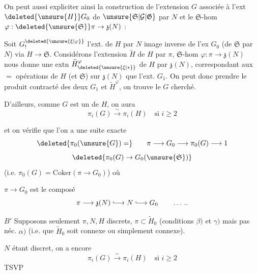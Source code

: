 On peut aussi expliciter ainsi la construction de l'extension \(G\)  associée à l'ext \(\deleted{\unsure{H}}G_0\) de \(\unsure{\mathfrak{S}|\mathcal{G}|\mathfrak{G}}\) par \(N\) et le \(\mathfrak{S}\)-hom \(\varphi:\deleted{\unsure{\mathfrak{S}}}\pi\to\mathfrak{z}(N)\) :

Soit \(G_{!}^{\deleted{\unsure{\xi|\varphi}}}\) l'ext. de \(H\) par \(N\) image inverse de l'ex \(G_0\) (de \(\mathfrak{S}\) par \(N\)) via \(H\to\mathfrak{S}\). Considérons l'extension \(\widetilde H\) de \(H\) par \(\pi\),  \(\mathfrak{S}\)-hom \(\varphi:\pi\to\mathfrak{z}(N)\) nous donne une extn  \(\widetilde H^{\varphi}_{\deleted{\unsure{\xi|\ast}}}\) de \(H\) par \(\mathfrak{z}(N)\), correspondant aux \(=\) opérations de \(H\) (et \(\mathfrak{S}\)) sur \(\mathfrak{z}(N)\) que l'ext. \(G_1\). On peut donc prendre le produit contracté des deux  \(G_1\) et \(\widetilde H^\varphi\), on trouve le \(G\) cherché.

D'ailleurs,  comme \(G\) est un  de \(H\), on aura
\[
 \pi_i(G)\xrightarrow{\sim}\pi_i(H)\quad\text{si }i\geq2
\]

et on vérifie que l'on a une suite exacte
\[
 \deleted{\pi_0(\unsure{G})=}\qquad
 \pi\longrightarrow G_0\longrightarrow\pi_0(G)\longrightarrow1
\]
\[
 \deleted{\pi_0(G)\to G_0(\unsure{\mathfrak{S}})}
\]
(i.e. \(\pi_0(G)=\mathrm{Coker}(\pi\to G_0)\)) où

\(\pi\to G_0\) est le composé
\[
 \pi\longrightarrow\mathfrak{z}(N)\lhook\joinrel\longrightarrow N\lhook\joinrel\longrightarrow G_0\qquad \ldots\,..
\]

\textcircled{\(B'\)} Supposons seulement \(\pi,N,H\) discrets, \(\pi\subset\widetilde H_0\) (conditions \(\beta)\) et \(\gamma)\) mais pas néc. \(\alpha)\) (i.e. que \(\widetilde H_0\) soit connexe ou simplement connexe).

\(N\) étant discret, on a encore
\[
 \pi_i(G)\xrightarrow{\sim}\pi_i(H)\quad\text{si }i\geq2
\]
\hfill TSVP


